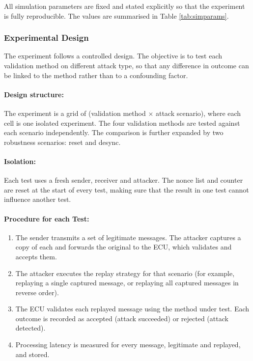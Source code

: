 \documentclass[a4paper,man,12pt]{article}
\begin{document}
All simulation parameters are fixed and stated explicitly so that the experiment is fully reproducible. The values are summarised in Table \ref{tab:simparams}.
 

\subsubsection{Experimental Design}

The experiment follows a controlled design. The objective is to test each validation method on different attack type, so that any difference in outcome can be linked to the method rather than to a confounding factor.

\paragraph{Design structure:}

The experiment is a grid of (validation method $\times$ attack scenario), where each cell is one isolated experiment. The four validation methods are tested against each scenario independently. The comparison is further expanded by two robustness scenarios: reset and desync.

\paragraph{Isolation:}

Each test uses a fresh sender, receiver and attacker. The nonce list and counter are reset at the start of every test, making sure that the result in one test cannot influence another test.

\paragraph{Procedure for each Test:}
\begin{enumerate}
    \item The sender transmits a set of legitimate messages. The attacker
    captures a copy of each and forwards the original to the ECU, which
    validates and accepts them. 

    \item The attacker executes the replay strategy for that scenario (for
    example, replaying a single captured message, or replaying all captured
    messages in reverse order).
    
    \item The ECU validates each replayed message using the method under test.
    Each outcome is recorded as accepted (attack succeeded) or rejected (attack
    detected).

    \item Processing latency is measured for every message, legitimate and
    replayed, and stored.
\end{enumerate}
\end{document}
